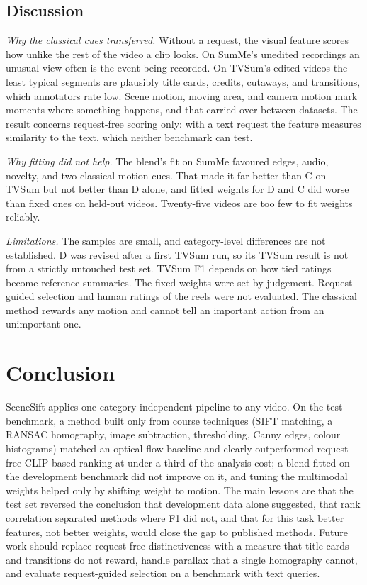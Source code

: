 \documentclass[conference]{IEEEtran}
\begin{document}
\subsection{Discussion}
\emph{Why the classical cues transferred.} Without a request, the visual feature scores how unlike the rest of the video a clip looks. On SumMe's unedited recordings an unusual view often is the event being recorded. On TVSum's edited videos the least typical segments are plausibly title cards, credits, cutaways, and transitions, which annotators rate low. Scene motion, moving area, and camera motion mark moments where something happens, and that carried over between datasets. The result concerns request-free scoring only: with a text request the feature measures similarity to the text, which neither benchmark can test.

\emph{Why fitting did not help.} The blend's fit on SumMe favoured edges, audio, novelty, and two classical motion cues. That made it far better than C on TVSum but not better than D alone, and fitted weights for D and C did worse than fixed ones on held-out videos. Twenty-five videos are too few to fit weights reliably.

\emph{Limitations.} The samples are small, and category-level differences are not established. D was revised after a first TVSum run, so its TVSum result is not from a strictly untouched test set. TVSum F1 depends on how tied ratings become reference summaries. The fixed weights were set by judgement. Request-guided selection and human ratings of the reels were not evaluated. The classical method rewards any motion and cannot tell an important action from an unimportant one.

\section{Conclusion}
SceneSift applies one category-independent pipeline to any video. On the test benchmark, a method built only from course techniques (SIFT matching, a RANSAC homography, image subtraction, thresholding, Canny edges, colour histograms) matched an optical-flow baseline and clearly outperformed request-free CLIP-based ranking at under a third of the analysis cost; a blend fitted on the development benchmark did not improve on it, and tuning the multimodal weights helped only by shifting weight to motion. The main lessons are that the test set reversed the conclusion that development data alone suggested, that rank correlation separated methods where F1 did not, and that for this task better features, not better weights, would close the gap to published methods. Future work should replace request-free distinctiveness with a measure that title cards and transitions do not reward, handle parallax that a single homography cannot, and evaluate request-guided selection on a benchmark with text queries.




\end{document}

